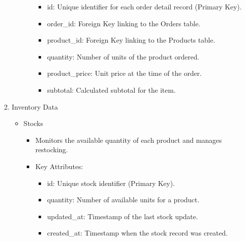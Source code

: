 \documentclass{llncs}
\begin{document}
\begin{enumerate}
\begin{itemize}
\begin{itemize}
                              \begin{itemize}
                                  \item id: Unique identifier for each order detail record (Primary Key).
                                  \item order\_id: Foreign Key linking to the Orders table.
                                  \item product\_id: Foreign Key linking to the Products table.
                                  \item quantity: Number of units of the product ordered.
                                  \item product\_price: Unit price at the time of the order.
                                  \item subtotal: Calculated subtotal for the item.

                              \end{itemize}
                    \end{itemize}
          \end{itemize}

    \item Inventory Data\\
          \begin{itemize}
              \item Stocks
                    \begin{itemize}
                        \item Monitors the available quantity of each product and manages restocking.
                        \item Key Attributes:
                              \begin{itemize}
                                  \item id: Unique stock identifier (Primary Key).
                                  \item quantity: Number of available units for a product.
                                  \item updated\_at: Timestamp of the last stock update.
                                  \item created\_at: Timestamp when the stock record was created.


\end{itemize}
\end{itemize}
\end{itemize}
\end{enumerate}
\end{document}
